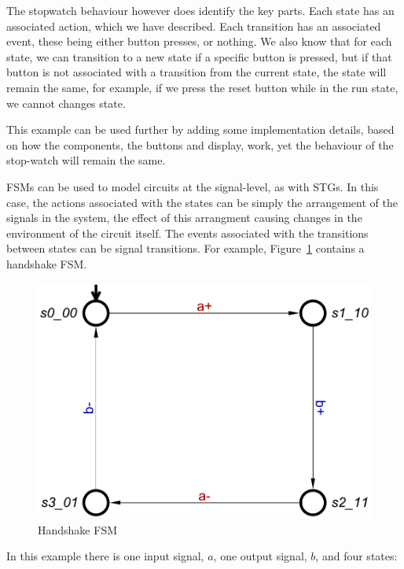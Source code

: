 The stopwatch behaviour however does identify the key parts. Each state has an associated action, which we have described. Each transition
has an associated event, these being either button presses, or nothing. We also know that for each state, we can transition to a new state if a
specific button is pressed, but if that button is not associated with a transition from the current state, the state will remain the same, for example, 
if we press the reset button while in the run state, we cannot changes state. 

This example can be used further by adding some implementation details, based on how the components, the buttons and display, work, yet 
the behaviour of the stop-watch will remain the same. 

FSMs can be used to model circuits at the signal-level, as with STGs. In this case, the actions associated with the states can be simply the
arrangement of the signals in the system, the effect of this arrangment causing changes in the environment of the circuit itself. The events 
associated with the transitions between states can be signal transitions. For example, Figure~\ref{fig:handshake-fsm} contains a handshake FSM.

\begin{figure}[h]
\begin{centering}
\includegraphics[scale=0.4]{images/handshake-fsm}
\par\end{centering}
\protect\caption{\label{fig:handshake-fsm} Handshake FSM}
\end{figure}

In this example there is one input signal, $a$, one output signal, $b$, and four states: 

